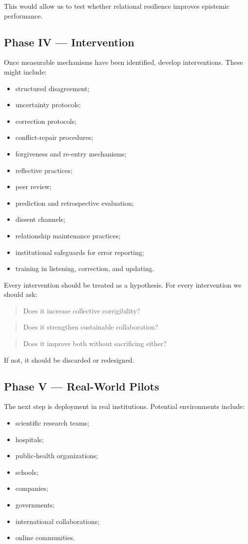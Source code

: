 \documentclass{article}
\begin{document}
This would allow us to test whether relational resilience improves epistemic performance.

\subsection{Phase IV — Intervention}
Once measurable mechanisms have been identified, develop interventions. These might include:
\begin{itemize}
    \item structured disagreement;
    \item uncertainty protocols;
    \item correction protocols;
    \item conflict-repair procedures;
    \item forgiveness and re-entry mechanisms;
    \item reflective practices;
    \item peer review;
    \item prediction and retrospective evaluation;
    \item dissent channels;
    \item relationship maintenance practices;
    \item institutional safeguards for error reporting;
    \item training in listening, correction, and updating.
\end{itemize}

Every intervention should be treated as a hypothesis. For every intervention we should ask:
\begin{quote}
    Does it increase collective corrigibility?
\end{quote}
\begin{quote}
    Does it strengthen sustainable collaboration?
\end{quote}
\begin{quote}
    Does it improve both without sacrificing either?
\end{quote}

If not, it should be discarded or redesigned.

\subsection{Phase V — Real-World Pilots}
The next step is deployment in real institutions. Potential environments include:
\begin{itemize}
    \item scientific research teams;
    \item hospitals;
    \item public-health organizations;
    \item schools;
    \item companies;
    \item governments;
    \item international collaborations;
    \item online communities.
\end{itemize}
\end{document}
